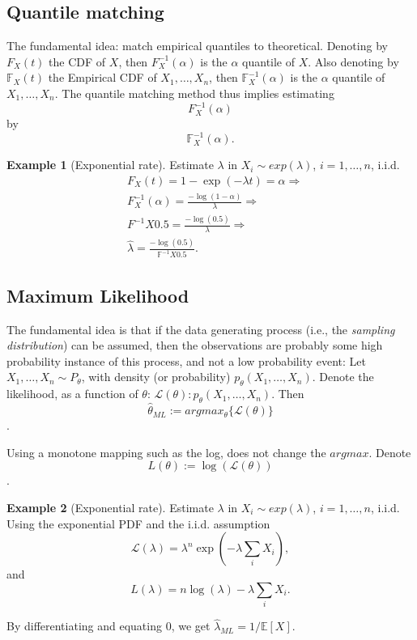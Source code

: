 \documentclass[12pt,a4paper]{article}
\theoremstyle{plain}
\theoremstyle{definition}
\newtheorem{example}{Example}
\newcommand{\expectn}[1]{\mathbb{E}\left[#1\right]}
\newcommand{\cdf}{F}
\newcommand{\cdfn}{\mathbb{F}}
\newcommand{\icdf}{F^{-1}}
\newcommand{\icdfn}{\mathbb{F}^{-1}}
\newcommand{\lik}{\mathcal{L}}
\newcommand{\loglik}{L}
\begin{document}
\subsection{Quantile matching}
\label{sec:quantiles}
The fundamental idea: match empirical quantiles to theoretical. 
Denoting by $\cdf_X(t)$ the CDF of $X$, then $\icdf_X(\alpha)$ is the $\alpha$ quantile of $X$.
Also denoting by $\cdfn_X(t)$ the Empirical CDF of $X_1,\dots, X_n$, then $\icdfn_X(\alpha)$ is the $\alpha$ quantile of $X_1,\dots, X_n$.
The quantile matching method thus implies estimating
$$ \icdf_X(\alpha)   $$
by 
$$ \icdfn_X(\alpha)  . $$

\begin{example}[Exponential rate]
Estimate $\lambda$ in $X_i \sim exp(\lambda)$, $i=1,\dots,n$, i.i.d.
\begin{align*}
	& \cdf_X(t) = 1-\exp(-\lambda t) = \alpha \Rightarrow \\
	& \icdf_X(\alpha) = \frac{-\log(1-\alpha)}{\lambda} \Rightarrow \\
	& \icdf{X}{0.5} = \frac{-\log(0.5)}{\lambda} \Rightarrow \\
	& \hat{\lambda} = \frac{-\log(0.5)}{\icdfn{X}{0.5}}.
\end{align*}

\end{example}


\subsection{Maximum Likelihood}
\label{sec:ml}

The fundamental idea is that if the data generating process (i.e., the \emph{sampling distribution}) can be assumed, then the observations are probably some high probability instance of this process, and not a low probability event:
Let $X_1,\dots,X_n \sim P_\theta$, with density (or probability) $p_\theta(X_1,\dots,X_n)$.
Denote the likelihood, as a function of $\theta$: $\lik(\theta): p_\theta(X_1,\dots,X_n)$.
Then $$\hat{\theta}_{ML}:= argmax_{\theta}\{ \lik(\theta) \}$$.

Using a monotone mapping such as the log, does not change the $argmax$. 
Denote $$\loglik(\theta):=\log(\lik(\theta))$$.

 
\begin{example}[Exponential rate]

Estimate $\lambda$ in $X_i \sim exp(\lambda)$, $i=1,\dots,n$, i.i.d.
Using the exponential PDF and the i.i.d. assumption
$$ \lik(\lambda) = \lambda^n \exp(-\lambda \sum_i X_i), $$
and 
$$ \loglik(\lambda) = n \log(\lambda) -\lambda \sum_i X_i. $$

By differentiating and equating $0$, we get $\hat{\lambda}_{ML}=1/\expectn{X}$.

\end{example}
\end{document}
